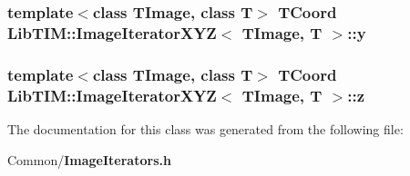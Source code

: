 \subsubsection{\setlength{\rightskip}{0pt plus 5cm}template$<$class TImage, class T$>$ {\bf TCoord} {\bf Lib\-TIM::Image\-Iterator\-XYZ}$<$ TImage, T $>$::{\bf y}}\label{classLibTIM_1_1ImageIteratorXYZ_o1}


\subsubsection{\setlength{\rightskip}{0pt plus 5cm}template$<$class TImage, class T$>$ {\bf TCoord} {\bf Lib\-TIM::Image\-Iterator\-XYZ}$<$ TImage, T $>$::{\bf z}}\label{classLibTIM_1_1ImageIteratorXYZ_o2}




The documentation for this class was generated from the following file:\begin{CompactItemize}
\item 
Common/{\bf Image\-Iterators.h}\end{CompactItemize}
